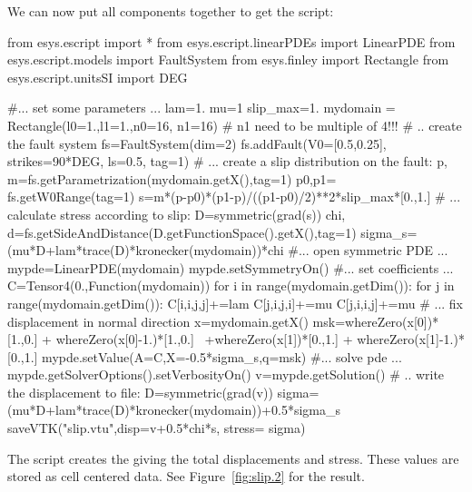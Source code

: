 We can now put all components together to get the script:
\begin{python}
from esys.escript import *
from esys.escript.linearPDEs import LinearPDE
from esys.escript.models import FaultSystem
from esys.finley import Rectangle
from esys.escript.unitsSI import DEG

#... set some parameters ...
lam=1.
mu=1
slip_max=1.
mydomain = Rectangle(l0=1.,l1=1.,n0=16, n1=16)  # n1 need to be multiple of 4!!!
# .. create the fault system
fs=FaultSystem(dim=2)
fs.addFault(V0=[0.5,0.25], strikes=90*DEG, ls=0.5, tag=1)
# ... create a slip distribution on the fault:
p, m=fs.getParametrization(mydomain.getX(),tag=1)
p0,p1= fs.getW0Range(tag=1)
s=m*(p-p0)*(p1-p)/((p1-p0)/2)**2*slip_max*[0.,1.]
# ... calculate stress according to slip:
D=symmetric(grad(s))
chi, d=fs.getSideAndDistance(D.getFunctionSpace().getX(),tag=1)
sigma_s=(mu*D+lam*trace(D)*kronecker(mydomain))*chi
#... open symmetric PDE ...
mypde=LinearPDE(mydomain)
mypde.setSymmetryOn()
#... set coefficients ...
C=Tensor4(0.,Function(mydomain))
for i in range(mydomain.getDim()):
  for j in range(mydomain.getDim()):
     C[i,i,j,j]+=lam
     C[j,i,j,i]+=mu
     C[j,i,i,j]+=mu
# ... fix displacement in normal direction 
x=mydomain.getX()
msk=whereZero(x[0])*[1.,0.] + whereZero(x[0]-1.)*[1.,0.] \
   +whereZero(x[1])*[0.,1.] + whereZero(x[1]-1.)*[0.,1.]
mypde.setValue(A=C,X=-0.5*sigma_s,q=msk)
#... solve pde ...
mypde.getSolverOptions().setVerbosityOn()
v=mypde.getSolution()
# .. write the displacement to file:
D=symmetric(grad(v))
sigma=(mu*D+lam*trace(D)*kronecker(mydomain))+0.5*sigma_s
saveVTK("slip.vtu",disp=v+0.5*chi*s, stress= sigma)
\end{python}
The script creates the  giving the total displacements and stress. These values are stored as cell 
centered data. See Figure~\ref{fig:slip.2} for the result.
